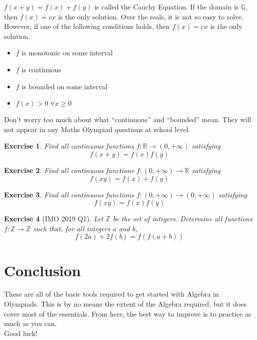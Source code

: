 \documentclass[a4paper,12pt]{article}
\newtheorem{exercise}{Exercise}[section]
\begin{document}
$f(x + y) = f(x) + f(y)$ is called the Cauchy Equation. If the domain is $\mathbb{Q}$, then $f(x) = cx$ is the only solution. Over the reals, it is not so easy to solve. However, if one of the following conditions holds, then $f(x) = cx$ is the only solution.
\begin{itemize}
    \item $f$ is monotonic on some interval
    \item $f$ is continuous
    \item $f$ is bounded on some interval
    \item $f(x) > 0 \; \forall x \ge 0$
\end{itemize}

Don't worry too much about what ``continuous'' and ``bounded'' mean. They will not appear in any Maths Olympiad questions at school level.

\begin{exercise}
    Find all continuous functions $f: \mathbb{R} \rightarrow (0, +\infty)$ satisfying
    $$f(x + y) = f(x)f(y)$$
\end{exercise}
\begin{exercise}
    Find all continuous functions $f: (0, +\infty) \rightarrow \mathbb{R}$ satisfying
    $$f(xy) = f(x) + f(y)$$
\end{exercise}
\begin{exercise}
    Find all continuous functions $f: (0, +\infty) \rightarrow (0, +\infty)$ satisfying
    $$f(xy) = f(x)f(y)$$
\end{exercise}
\begin{exercise}[IMO 2019 Q1]
    Let $\mathbb{Z}$ be the set of integers. Determine all functions $f: \mathbb{Z} \rightarrow \mathbb{Z}$ such that, for all integers $a$ and $b$,
    $$f(2a) + 2f(b) = f(f(a + b))$$
\end{exercise}

\clearpage
\section{Conclusion}
These are all of the basic tools required to get started with Algebra in Olympiads. This is by no means the extent of the Algebra required, but it does cover most of the essentials. From here, the best way to improve is to practice as much as you can.\\ Good luck!
\end{document}
